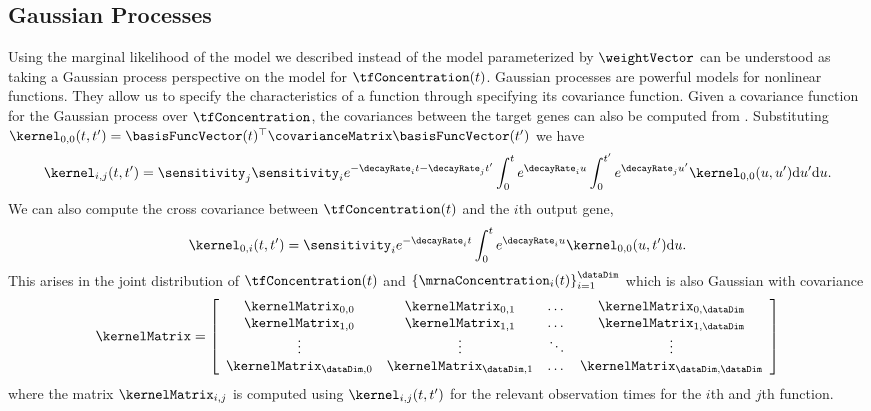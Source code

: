 \documentclass{article}
\begin{document}

\subsection{Gaussian Processes}

Using the marginal likelihood of the model we described instead of the
model parameterized by $\weightVector$ can be understood as taking a
Gaussian process perspective on the model for
$\tfConcentration(t)$. Gaussian processes are powerful models for
nonlinear functions. They allow us to specify the characteristics of a
function through specifying its covariance function. Given a covariance function for the Gaussian process over $\tfConcentration$, the covariances between the target genes can also be computed from . Substituting $\kernel_{0,0}(t, t^\prime)=\basisFuncVector(t)^\top \covarianceMatrix \basisFuncVector(t^\prime)$ we have 
\[
\kernel_{i,j}(t,t^\prime) = \sensitivity_j\sensitivity_i e^{-\decayRate_{i}t-\decayRate_{j}t^\prime}\int_0^t
e^{\decayRate_{i}u} \int_0^{t^\prime} e^{\decayRate_{j}u^\prime}\kernel_{0,0}(u, u^\prime)\mathrm{d}u^\prime \mathrm{d}u.
\]
We can also compute the cross covariance between $\tfConcentration(t)$ and the $i$th output gene, 
\[
\kernel_{0,i}(t, t^\prime) = \sensitivity_i e^{-\decayRate_{i}t}\int_0^t
e^{\decayRate_{i}u} \kernel_{0,0}(u, t^\prime)\mathrm{d}u.
\]
This arises in the joint distribution of $\tfConcentration(t)$ and $\left\{\mrnaConcentration_i(t)\right\}_{i=1}^\dataDim$ which is also Gaussian with covariance 
\[
\kernelMatrix = \left[\begin{array}{cccc}
\kernelMatrix_{0, 0} & \kernelMatrix_{0, 1}& \dots &\kernelMatrix_{0,\dataDim}\\
\kernelMatrix_{1, 0} & \kernelMatrix_{1, 1}& \dots &\kernelMatrix_{1,\dataDim}\\
\vdots &\vdots &\ddots & \vdots\\
\kernelMatrix_{\dataDim, 0} & \kernelMatrix_{\dataDim,  1} & \dots & \kernelMatrix_{\dataDim, \dataDim}
\end{array}\right]
\] 
where the matrix $\kernelMatrix_{i, j}$ is computed using $\kernel_{i, j}(t, t^\prime)$ for the relevant observation times for the $i$th and $j$th function.
\end{document}
